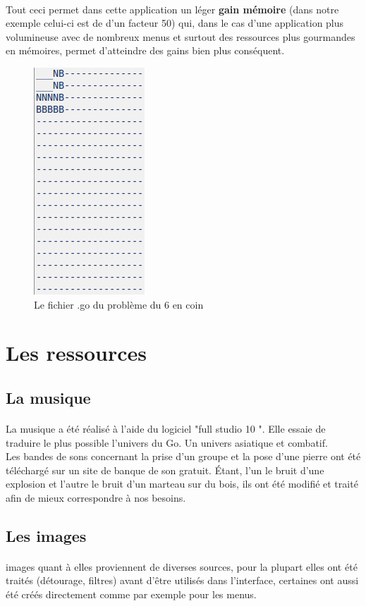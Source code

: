             \paragraph{}Tout ceci permet dans cette application un léger \textbf{gain mémoire} (dans notre exemple celui-ci est de d’un facteur 50) qui, dans le cas d’une application plus volumineuse avec de nombreux menus et surtout des ressources plus gourmandes en mémoires, permet d’atteindre des gains bien plus conséquent.
            
            \begin{figure}[h!]
            \centering
            \includegraphics[scale=0.39]{figures/experiments/fichierGo.png}
            \caption{Le fichier .go du problème du 6 en coin}
            \label{fig:menu_prbls}
            \end{figure}

    \section{Les ressources}
        \subsection{La musique}
            \paragraph{}La musique a été réalisé à l'aide du logiciel "full studio 10 ". Elle essaie de traduire le plus possible l'univers du Go. Un univers asiatique et combatif.\\
            Les bandes de sons concernant la prise d'un groupe et la pose d'une pierre ont été téléchargé sur un site de banque de son gratuit. Étant, l'un le bruit d'une explosion et l'autre le bruit d'un marteau sur du bois, ils ont été modifié et traité afin de mieux correspondre à nos besoins.
    
        \subsection{Les images}
            \paragraph{} images quant à elles proviennent de diverses sources, pour la plupart elles ont été traités (détourage, filtres) avant d'être utilisés dans l'interface, certaines ont aussi été créés directement comme par exemple pour les menus.